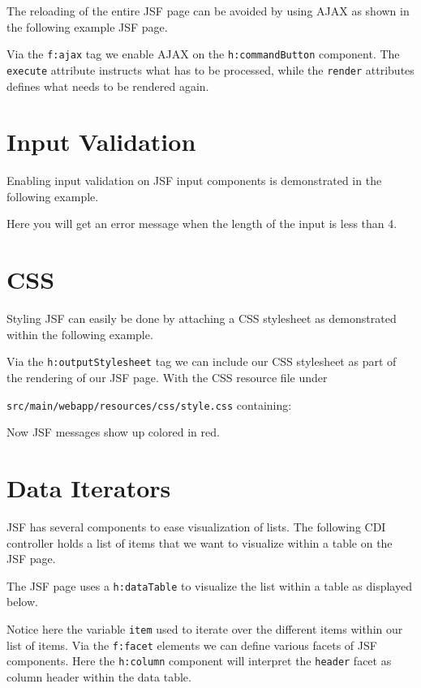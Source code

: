 The reloading of the entire JSF page can be avoided by using AJAX as shown in the following example JSF page.

Via the \texttt{f:ajax} tag we enable AJAX on the \texttt{h:commandButton} component.
The \texttt{execute} attribute instructs what has to be processed, while the \texttt{render} attributes defines what needs to be rendered again.


\section{Input Validation}

Enabling input validation on JSF input components is demonstrated in the following example.

Here you will get an error message when the length of the input is less than 4.

\section{CSS}

Styling JSF can easily be done by attaching a CSS stylesheet as demonstrated within the following example.

Via the \texttt{h:outputStylesheet} tag we can include our CSS stylesheet as part of the rendering of our JSF page.
With the CSS resource file under

\texttt{src/main/webapp/resources/css/style.css} containing:

Now JSF messages show up colored in red.

\section{Data Iterators}

JSF has several components to ease visualization of lists.
The following CDI controller holds a list of items that we want to visualize within a table on the JSF page.


The JSF page uses a \texttt{h:dataTable} to visualize the list within a table as displayed below.

Notice here the variable \texttt{item} used to iterate over the different items within our list of items.
Via the \texttt{f:facet} elements we can define various facets of JSF components.
Here the \texttt{h:column} component will interpret the \texttt{header} facet as column header within the data table.

